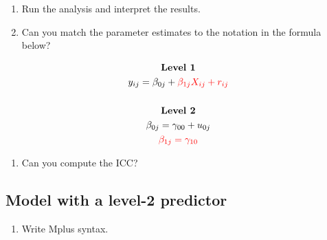 \documentclass[
]{book}
\providecommand{\tightlist}{%
  \setlength{\itemsep}{0pt}\setlength{\parskip}{0pt}}
\begin{document}
\begin{enumerate}
\def\labelenumi{\arabic{enumi}.}
\setcounter{enumi}{1}
\item
  Run the analysis and interpret the results.
\item
  Can you match the parameter estimates to the notation in the formula below?
\end{enumerate}

\[
\begin{gathered}
\textbf{Level 1} \\
y_{ij}=\beta_{0j} + \color{red}{\beta_{1j}X_{ij}} + r_{ij} \\ \\
\textbf{Level 2} \\
\beta_{0j}=\gamma_{00} + u_{0j} \\
\color{red}{\beta_{1j}=\gamma_{10}}
\end{gathered}
\]

\begin{enumerate}
\def\labelenumi{\arabic{enumi}.}
\setcounter{enumi}{3}
\tightlist
\item
  Can you compute the ICC?
\end{enumerate}

\subsection{Model with a level-2 predictor}\label{model-with-a-level-2-predictor}

\begin{enumerate}
\def\labelenumi{\arabic{enumi}.}
\tightlist
\item
  Write Mplus syntax.
\end{enumerate}
\end{document}
